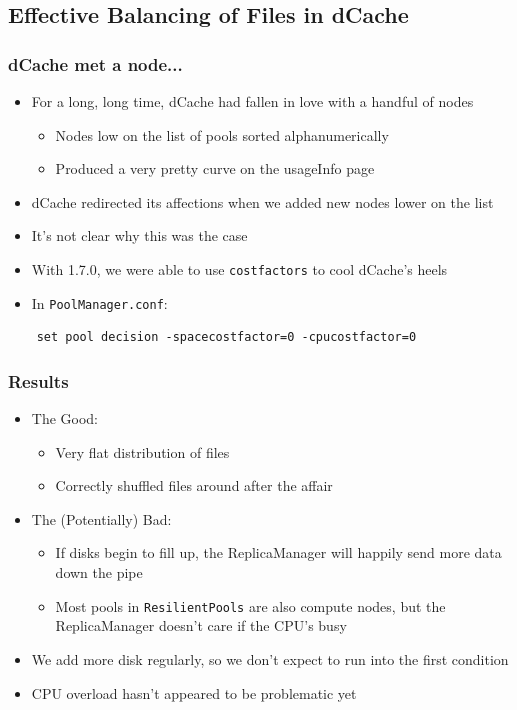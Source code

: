 \documentclass{beamer}
\begin{document}
\subsection[dCache Load Balancing]{Effective Balancing of Files in dCache}
\begin{frame}[fragile]
\frametitle{dCache met a node...}
\begin{itemize}
    \item For a long, long time, dCache had fallen in love with a handful of nodes
    \begin{itemize}
        \item Nodes low on the list of pools sorted alphanumerically
        \item Produced a very pretty curve on the usageInfo page
    \end{itemize}
    \item dCache redirected its affections when we added new nodes lower on the list
    \item It's not clear why this was the case
    \item With 1.7.0, we were able to use {\tt costfactors} to cool dCache's 
    heels
    \item In {\tt PoolManager.conf}:
\end{itemize}
\begin{verbatim}
    set pool decision -spacecostfactor=0 -cpucostfactor=0
\end{verbatim}
\end{frame}

\begin{frame}
\frametitle{Results}
\begin{itemize}
    \item The Good:
    \begin{itemize}
        \item Very flat distribution of files
        \item Correctly shuffled files around after the affair
    \end{itemize}
    \item The (Potentially) Bad:
    \begin{itemize}
        \item If disks begin to fill up, the ReplicaManager will happily send more data down the pipe
        \item Most pools in {\tt ResilientPools} are also compute nodes, but the ReplicaManager doesn't care if the CPU's busy
    \end{itemize}
    \item We add more disk regularly, so we don't expect to run into the first condition
    \item CPU overload hasn't appeared to be problematic yet
\end{itemize}
\end{frame}
\end{document}
